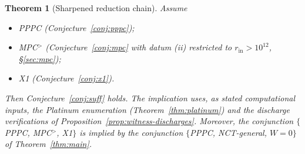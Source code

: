 \documentclass[11pt]{amsart}
\theoremstyle{plain}
\newtheorem{theorem}{Theorem}[section]
\theoremstyle{definition}
\theoremstyle{remark}
\numberwithin{equation}{section}
\begin{document}
\begin{theorem}[Sharpened reduction chain]\label{thm:sharpened-chain}
Assume
\begin{itemize}
\item PPPC (Conjecture~\ref{conj:pppc});
\item MPC$^{>}$ (Conjecture~\ref{conj:mpc} with datum (ii) restricted to $r_{\mathrm{in}} > 10^{12}$, \S\ref{sec:mpc});
\item X1 (Conjecture~\ref{conj:x1}).
\end{itemize}
Then Conjecture~\ref{conj:suff} holds. The implication uses, as stated computational inputs, the Platinum enumeration (Theorem~\ref{thm:platinum}) and the discharge verifications of Proposition~\ref{prop:witness-discharges}. Moreover, the conjunction $\{$PPPC, MPC$^{>}$, X1$\}$ is implied by the conjunction $\{$PPPC, NCT-general, $W = 0\}$ of Theorem~\ref{thm:main}.
\end{theorem}
\end{document}

